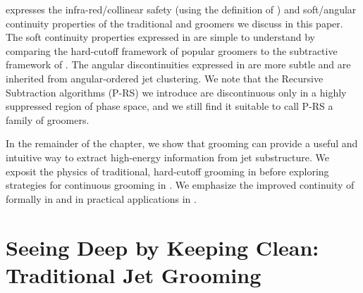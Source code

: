  expresses the infra-red/collinear safety (using the definition of ) and soft/angular continuity properties of the traditional and \PIRANHA{} groomers we discuss in this paper.
%
The soft continuity properties expressed in  are simple to understand by comparing the hard-cutoff framework of popular groomers to the subtractive framework of \PIRANHA{}.
%
The angular discontinuities expressed in  are more subtle and are inherited from angular-ordered jet clustering.
%
We note that the Recursive Subtraction algorithms (P-RS) we introduce are discontinuous only in a highly suppressed region of phase space, and we still find it suitable to call P-RS a family of \PIRANHA{} groomers.


In the remainder of the chapter, we show that grooming can provide a useful and intuitive way to extract high-energy information from jet substructure.
%
We exposit the physics of traditional, hard-cutoff grooming in  before exploring \PIRANHA{} strategies for continuous grooming in .
%
We emphasize the improved continuity of \PIRANHA{} formally in  and in practical applications in .





\section{Seeing Deep by Keeping Clean: Traditional Jet Grooming}
\label{sec:traditional-grooming}




